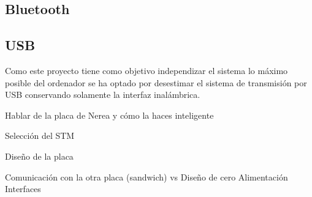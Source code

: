 \subsection{Bluetooth\label{sec:Bluetooth_N}}



\subsection{USB\label{sec:USB_N}}


Como este proyecto tiene como objetivo independizar el sistema lo máximo posible del ordenador se ha optado por desestimar el sistema de transmisión por \Gls{USB} conservando solamente la interfaz inalámbrica. 

Hablar de la placa de Nerea y cómo la haces inteligente

Selección del STM

Diseño de la placa

	Comunicación con la otra placa (sandwich) vs Diseño de cero
	Alimentación
	Interfaces
